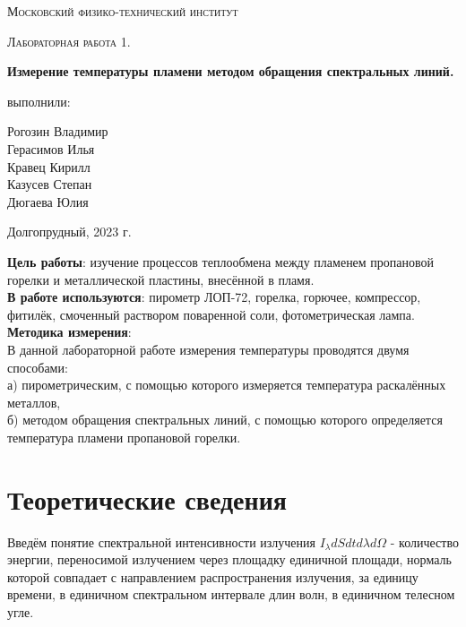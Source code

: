 \documentclass[12pt,a4paper]{article}
\author{Кравец Кирилл}
\begin{document}
	
	\begin{titlepage}
		\centering
		\vspace{5cm}
		{\scshape\LARGE Московский физико-технический институт \par}
		\vspace{4cm}
		{\scshape\Large Лабораторная работа 1. \par}
		\vspace{1cm}
		{\huge\bfseries Измерение температуры пламени методом обращения спектральных линий. \par}
		\vspace{1cm}
		\vfill
		\begin{flushright}
			{\large выполнили: }\par
			\vspace{0.3cm}
			{\LARGE 
			Рогозин Владимир\\
			Герасимов Илья\\
			Кравец Кирилл\\
			Казусев Степан\\
			Дюгаева Юлия}
		\end{flushright}
		
		
		\vfill
		
		Долгопрудный, 2023 г.
	\end{titlepage}
	
	\textbf{Цель работы}: изучение процессов теплообмена между пламенем пропановой горелки и металлической пластины, внесённой в пламя.\\
	
	
	\textbf{В работе используются}: пирометр ЛОП-72, горелка, горючее, компрессор, фитилёк, смоченный раствором поваренной соли, фотометрическая лампа.\\
	
	\textbf{Методика измерения}:\\ 
	В данной лабораторной работе измерения температуры проводятся двумя способами:\\
	а) пирометрическим, с помощью которого измеряется температура раскалённых металлов,\\
	б) методом обращения спектральных линий, с помощью которого определяется температура пламени пропановой горелки.
	
	\section*{Теоретические сведения}
	
	Введём понятие спектральной интенсивности излучения $I_\lambda dS dt d\lambda d\Omega$ - количество энергии, переносимой излучением через площадку единичной площади, нормаль которой совпадает с направлением распространения излучения, за единицу времени, в единичном спектральном интервале длин волн, в единичном телесном угле.
	
\end{document}
